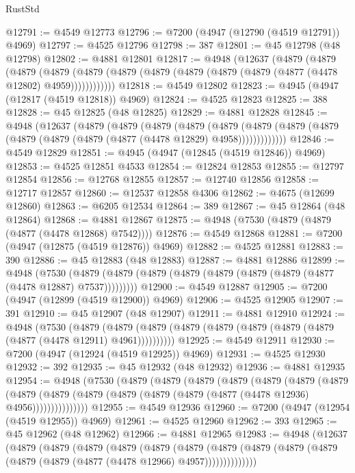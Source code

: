 \begin{lexlean}{RustStd}
\begin{coremodule}
@12791 := @4549 @12773
@12796 := @7200 (@4947 (@12790 (@4519 @12791)) @4969)
@12797 := @4525 @12796
@12798 := 387
@12801 := @45 @12798 (@48 @12798)
@12802 := @4881 @12801
@12817 := @4948
    (@12637
      (@4879
        (@4879
          (@4879
            (@4879 (@4879 (@4879 (@4879 (@4879 (@4879 (@4879 (@4877 (@4478 @12802) @4959))))))))))))
@12818 := @4549 @12802
@12823 := @4945 (@4947 (@12817 (@4519 @12818)) @4969)
@12824 := @4525 @12823
@12825 := 388
@12828 := @45 @12825 (@48 @12825)
@12829 := @4881 @12828
@12845 := @4948
    (@12637
      (@4879
        (@4879
          (@4879
            (@4879
              (@4879
                (@4879 (@4879 (@4879 (@4879 (@4879 (@4879 (@4877 (@4478 @12829) @4958)))))))))))))
@12846 := @4549 @12829
@12851 := @4945 (@4947 (@12845 (@4519 @12846)) @4969)
@12853 := @4525 @12851 @4533
@12854 := @12824 @12853
@12855 := @12797 @12854
@12856 := @12768 @12855
@12857 := @12740 @12856
@12858 := @12717 @12857
@12860 := @12537 @12858 @4306
@12862 := @4675 (@12699 @12860)
@12863 := @6205 @12534
@12864 := 389
@12867 := @45 @12864 (@48 @12864)
@12868 := @4881 @12867
@12875 := @4948 (@7530 (@4879 (@4879 (@4877 (@4478 @12868) @7542))))
@12876 := @4549 @12868
@12881 := @7200 (@4947 (@12875 (@4519 @12876)) @4969)
@12882 := @4525 @12881
@12883 := 390
@12886 := @45 @12883 (@48 @12883)
@12887 := @4881 @12886
@12899 := @4948
    (@7530 (@4879 (@4879 (@4879 (@4879 (@4879 (@4879 (@4879 (@4877 (@4478 @12887) @7537)))))))))
@12900 := @4549 @12887
@12905 := @7200 (@4947 (@12899 (@4519 @12900)) @4969)
@12906 := @4525 @12905
@12907 := 391
@12910 := @45 @12907 (@48 @12907)
@12911 := @4881 @12910
@12924 := @4948
    (@7530
      (@4879 (@4879 (@4879 (@4879 (@4879 (@4879 (@4879 (@4879 (@4877 (@4478 @12911) @4961))))))))))
@12925 := @4549 @12911
@12930 := @7200 (@4947 (@12924 (@4519 @12925)) @4969)
@12931 := @4525 @12930
@12932 := 392
@12935 := @45 @12932 (@48 @12932)
@12936 := @4881 @12935
@12954 := @4948
    (@7530
      (@4879
        (@4879
          (@4879
            (@4879
              (@4879
                (@4879
                  (@4879
                    (@4879
                      (@4879 (@4879 (@4879 (@4879 (@4879 (@4877 (@4478 @12936) @4956)))))))))))))))
@12955 := @4549 @12936
@12960 := @7200 (@4947 (@12954 (@4519 @12955)) @4969)
@12961 := @4525 @12960
@12962 := 393
@12965 := @45 @12962 (@48 @12962)
@12966 := @4881 @12965
@12983 := @4948
    (@12637
      (@4879
        (@4879
          (@4879
            (@4879
              (@4879
                (@4879
                  (@4879
                    (@4879 (@4879 (@4879 (@4879 (@4879 (@4877 (@4478 @12966) @4957))))))))))))))

\end{coremodule}
\end{lexlean}
